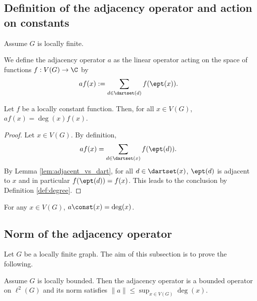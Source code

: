 \subsection{Definition of the adjacency operator and action on constants}

Assume $G$ is locally finite.

\begin{definition}
  \label{def:adjacency_operator}
  We define the adjacency operator $a$ as the linear operator acting on the space of
  functions $f : V(G) \rightarrow \C$ by
  $$ a f (x) :=
  \sum_{d \in \dartset(d)}
  f(\ept(x)).$$
\end{definition}

\begin{lemma}
  \label{lem:adjacency_locally_constant}
  Let $f$ be a locally constant function. Then, for all $x \in V(G)$,
  $af(x) = \deg(x) f(x)$.
\end{lemma}

\begin{proof}
  Let $x \in V(G)$.
  By definition,
  \begin{equation*}
    af(x) = \sum_{d \in \dartset(x)} f(\ept(d)).
  \end{equation*}
  By Lemma \ref{lem:adjacent_vs_dart},
  for all $d \in \dartset(x)$, $\ept(d)$ is adjacent to $x$
  and in particular $f(\ept(d))=f(x)$. This leads to the conclusion by
  Definition \ref{def:degree}.
\end{proof}

\begin{lemma}
  \label{lem:adjacency_of_constant}
  For any $x \in V(G)$, $a \const(x) = \deg(x)$.
\end{lemma}

\subsection{Norm of the adjacency operator}

Let $G$ be a locally finite graph.
The aim of this subsection is to prove the following.

\begin{theorem}
  \label{thm:norm_adjacency_leq_sup_degree}
  Assume $G$ is locally bounded.
  Then the adjacency operator is a bounded operator on $\ell^2(G)$ and
  its norm satisfies $\|a\| \leq \sup_{x \in V(G)} \deg(x)$.
\end{theorem}

